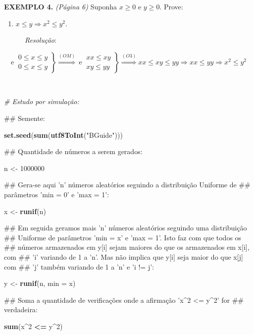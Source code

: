 \documentclass[]{book}
\newenvironment{Shaded}{\begin{snugshade}}{\end{snugshade}}
\newcommand{\KeywordTok}[1]{\textcolor[rgb]{0.13,0.29,0.53}{\textbf{#1}}}
\newcommand{\DataTypeTok}[1]{\textcolor[rgb]{0.13,0.29,0.53}{#1}}
\newcommand{\DecValTok}[1]{\textcolor[rgb]{0.00,0.00,0.81}{#1}}
\newcommand{\StringTok}[1]{\textcolor[rgb]{0.31,0.60,0.02}{#1}}
\newcommand{\CommentTok}[1]{\textcolor[rgb]{0.56,0.35,0.01}{\textit{#1}}}
\newcommand{\OperatorTok}[1]{\textcolor[rgb]{0.81,0.36,0.00}{\textbf{#1}}}
\newcommand{\NormalTok}[1]{#1}
\providecommand{\tightlist}{%
  \setlength{\itemsep}{0pt}\setlength{\parskip}{0pt}}
\begin{document}
\textbf{EXEMPLO 4.} \emph{(Página 6)} Suponha \(x \geqslant 0\) e
\(y \geqslant 0\). Prove:

\begin{enumerate}
\def\labelenumi{\alph{enumi})}
\setcounter{enumi}{1}
\tightlist
\item
  \(x \leqslant y \Rightarrow x^{2} \leqslant y^{2}\).
\end{enumerate}

~~~~~~\emph{Resolução}:

\[\textrm{e} \ \left.\begin{matrix} 0 \leqslant x \leqslant y\\ 0 \leqslant x \leqslant y \end{matrix}\right\} \overset{(OM)}{\Rightarrow} \ \textrm{e} \ \left.\begin{matrix} xx \leqslant xy \\ xy \leqslant yy \end{matrix}\right\} \overset{(O3)}{\Rightarrow} xx \leqslant xy \leqslant yy \Rightarrow xx \leqslant yy \Rightarrow x^{2} \leqslant y^{2}\]

~

\begin{Shaded}
\begin{Highlighting}[]
\CommentTok{# Estudo por simulação:}

\NormalTok{## Semente:}

\KeywordTok{set.seed}\NormalTok{(}\KeywordTok{sum}\NormalTok{(}\KeywordTok{utf8ToInt}\NormalTok{(}\StringTok{"BGuide"}\NormalTok{)))}

\NormalTok{## Quantidade de números a serem gerados:}

\NormalTok{n <-}\StringTok{ }\DecValTok{1000000}

\NormalTok{##  Gera-se aqui 'n' números aleatórios seguindo a distribuição Uniforme de}
\NormalTok{## parâmetros 'min = 0' e 'max = 1':}

\NormalTok{x <-}\StringTok{ }\KeywordTok{runif}\NormalTok{(n)}

\NormalTok{##  Em seguida geramos mais 'n' números aleatórios seguindo uma distribuição}
\NormalTok{## Uniforme de parâmetros 'min = x' e 'max = 1'. Isto faz com que todos os}
\NormalTok{## números armazenados em y[i] sejam maiores do que os armazenados em x[i], com}
\NormalTok{## 'i' variando de 1 a 'n'. Mas não implica que y[i] seja maior do que x[j] com}
\NormalTok{## 'j' também variando de 1 a 'n' e 'i != j':}

\NormalTok{y <-}\StringTok{ }\KeywordTok{runif}\NormalTok{(n, }\DataTypeTok{min =}\NormalTok{ x)}

\NormalTok{##  Soma a quantidade de verificações onde a afirmação 'x^2 <= y^2' for}
\NormalTok{## verdadeira:}

\KeywordTok{sum}\NormalTok{(x}\OperatorTok{^}\DecValTok{2} \OperatorTok{<=}\StringTok{ }\NormalTok{y}\OperatorTok{^}\DecValTok{2}\NormalTok{)}
\end{Highlighting}
\end{Shaded}
\end{document}
